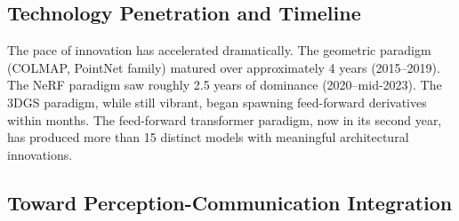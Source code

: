 \documentclass[journal]{IEEEtran}
\begin{document}
\begin{table}[t]
\caption{Comparative analysis of major reconstruction paradigms across intelligent perception criteria.}
\label{tab:overall_compare}
\centering
\scriptsize
\setlength{\tabcolsep}{2pt}
\end{table}

\subsection{Technology Penetration and Timeline}

The pace of innovation has accelerated dramatically. The geometric paradigm (COLMAP, PointNet family) matured over approximately 4 years (2015--2019). The NeRF paradigm saw roughly 2.5 years of dominance (2020--mid-2023). The 3DGS paradigm, while still vibrant, began spawning feed-forward derivatives within months. The feed-forward transformer paradigm, now in its second year, has produced more than 15 distinct models with meaningful architectural innovations.

\subsection{Toward Perception-Communication Integration}
\end{document}

